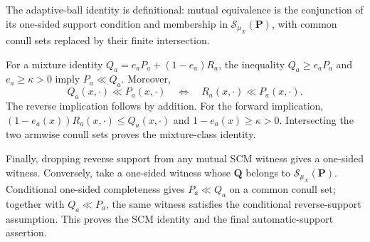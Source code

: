 The adaptive-ball identity is definitional: mutual equivalence is the conjunction of its one-sided support condition and membership in \(\mathcal S_{\mu_X}(\boldsymbol P)\), with common conull sets replaced by their finite intersection.

For a mixture identity \(Q_a=e_aP_a+(1-e_a)R_a\), the inequality \(Q_a\ge e_aP_a\) and \(e_a\ge\kappa>0\) imply \(P_a\ll Q_a\).  Moreover,
\[
 Q_a(x,\cdot)\ll P_a(x,\cdot)\quad\Longleftrightarrow\quad R_a(x,\cdot)\ll P_a(x,\cdot). \tag{1}
\]
The reverse implication follows by addition.  For the forward implication, \((1-e_a(x))R_a(x,\cdot)\le Q_a(x,\cdot)\) and \(1-e_a(x)\ge\kappa>0\).  Intersecting the two armwise conull sets proves the mixture-class identity.

Finally, dropping reverse support from any mutual SCM witness gives a one-sided witness.  Conversely, take a one-sided witness whose \(\boldsymbol Q\) belongs to \(\mathcal S_{\mu_X}(\boldsymbol P)\).  Conditional one-sided completeness gives \(P_a\ll Q_a\) on a common conull set; together with \(Q_a\ll P_a\), the same witness satisfies the conditional reverse-support assumption.  This proves the SCM identity and the final automatic-support assertion.